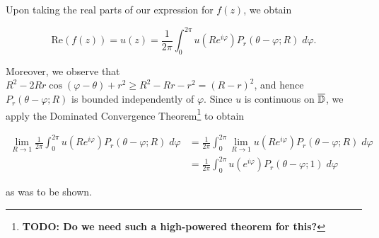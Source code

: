 \begin{solution}
    Upon taking the real parts of our expression for $f(z)$, we obtain

    $$
    \text{Re}(f(z)) = u(z) = \frac{1}{2 \pi} \int_0^{2 \pi} u(R e^{i \varphi}) P_r(\theta - \varphi; R) \; d\varphi.
    $$

    Moreover, we observe that $R^2  - 2 R r \cos{(\varphi - \theta)} + r^2 \ge R^2 - R r - r^2 = (R - r)^2$, and hence
    $P_r(\theta - \varphi; R)$ is bounded independently of $\varphi$. Since $u$ is continuous on $\overline{\mathbb{D}}$, we apply the
    Dominated Convergence Theorem\footnote{
      \textbf{TODO: Do we need such a high-powered theorem for this?}
    } to obtain

    \begin{align*}
      \lim_{R \to 1} \frac{1}{2 \pi} \int_0^{2 \pi} u(R e^{i \varphi}) P_r(\theta - \varphi; R) \; d\varphi 
      &= \frac{1}{2 \pi} \int_0^{2 \pi} \lim_{R \to 1} u(R e^{i \varphi}) P_r(\theta - \varphi; R) \; d\varphi \\
      & = \frac{1}{2 \pi} \int_0^{2 \pi} u(e^{i \varphi}) P_r(\theta - \varphi; 1) \; d\varphi
    \end{align*}

    as was to be shown.
\end{solution}